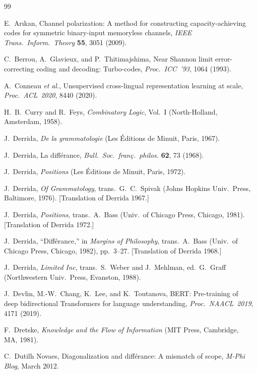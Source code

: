 \documentclass[a4paper,twocolumn,11pt]{article}
\begin{document}
\clearpage
\begin{thebibliography}{99}

E.~Ar\i kan,
Channel polarization: A method for constructing capacity-achieving codes for symmetric binary-input memoryless channels,
\emph{IEEE Trans.\ Inform.\ Theory} \textbf{55}, 3051 (2009).

C.~Berrou, A.~Glavieux, and P.~Thitimajshima,
Near Shannon limit error-correcting coding and decoding: Turbo-codes,
\emph{Proc.\ ICC~'93}, 1064 (1993).

A.~Conneau \emph{et al.},
Unsupervised cross-lingual representation learning at scale,
\emph{Proc.\ ACL~2020}, 8440 (2020).

H.~B.~Curry and R.~Feys,
\emph{Combinatory Logic}, Vol.~I
(North-Holland, Amsterdam, 1958).

J.~Derrida,
\emph{De la grammatologie}
(Les \'Editions de Minuit, Paris, 1967).

J.~Derrida,
La diff\'erance,
\emph{Bull.\ Soc.\ fran\c{c}.\ philos.} \textbf{62}, 73 (1968).

J.~Derrida,
\emph{Positions}
(Les \'Editions de Minuit, Paris, 1972).

J.~Derrida,
\emph{Of Grammatology}, trans.\ G.~C.~Spivak
(Johns Hopkins Univ.\ Press, Baltimore, 1976).
[Translation of Derrida 1967.]

J.~Derrida,
\emph{Positions}, trans.\ A.~Bass
(Univ.\ of Chicago Press, Chicago, 1981).
[Translation of Derrida 1972.]

J.~Derrida,
``Diff\'erance,'' in \emph{Margins of Philosophy},
trans.\ A.~Bass (Univ.\ of Chicago Press, Chicago, 1982), pp.~3--27.
[Translation of Derrida 1968.]

J.~Derrida,
\emph{Limited Inc}, trans.\ S.~Weber and J.~Mehlman, ed.\ G.~Graff
(Northwestern Univ.\ Press, Evanston, 1988).

J.~Devlin, M.-W.~Chang, K.~Lee, and K.~Toutanova,
BERT: Pre-training of deep bidirectional Transformers for language understanding,
\emph{Proc.\ NAACL~2019}, 4171 (2019).

F.~Dretske,
\emph{Knowledge and the Flow of Information}
(MIT Press, Cambridge, MA, 1981).

C.~Dutilh Novaes,
Diagonalization and diff\'erance: A mismatch of scope,
\emph{M-Phi Blog}, March 2012.


\end{thebibliography}
\end{document}
